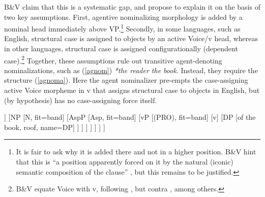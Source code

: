 \documentclass[output=paper,
modfonts
]{LSP/langsci}
\newcommand{\rf}[1]{(\ref{#1})}
\begin{document}
%
B\&V claim that this is a systematic gap, and propose to explain it on the basis of two key
assumptions.  First, agentive nominalizing morphology is added by a nominal head immediately
above VP.\footnote{It is fair to ask why it is added there and not in a higher position.  B\&V
  hint that this is ``a position apparently forced on it by the natural (iconic) semantic
  composition of the clause'' \citep[521]{baker2009}, but this remains to be justified.} Secondly, in some
languages, such as English, structural case is assigned to objects by an active Voice/v head,
whereas in other languages, structural case is assigned configurationally (dependent
case).\footnote{B\&V equate Voice with v, following \citet{kratzer2004}, but contra \citet{alexiadou2001,alexiadou2010,harley2012}, among others.} Together, these assumptions rule out transitive
agent-denoting nominalizations, such as \rf{agnom} \textit{*the reader the book}. Instead, they
require the structure \rf{agnoma}.  Here the agent nominalizer pre-empts the case-assigning
active Voice morpheme in v that assigns structural case to objects in English, but (by
hypothesis) has no case-assigning force itself.
\begin{exe}
	\ex\label{agnoma}\begin{forest}
			[DP
				[D
					[the]
				]
				[NP
					[N, fit=band]
					[AspP
						[Asp, fit=band]
						[vP
							[(PRO), fit=band]
							[v\1
								[-er, fit=band, name=v]
								[VP
									[V
										[read]
									]
									[DP
										[of the book, roof, name=DP]
									]
			]
			]
			]
			]
			]
			]
		\end{forest}
\end{exe}
\end{document}
